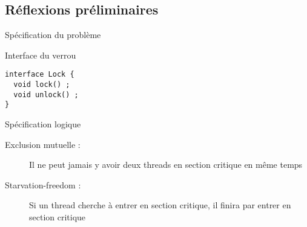 \mode*

\subsection{Réflexions préliminaires}
\begin{frame}[fragile]{Spécification du problème}

\begin{block}{Interface du verrou}
\begin{lstlisting}[numbers=none]
interface Lock {
  void lock() ;
  void unlock() ;
}
\end{lstlisting}
\end{block}

\begin{block}{Spécification logique}
\begin{description}
\item[Exclusion mutuelle : ] Il ne peut jamais y avoir deux threads en section critique en même temps
\item[Starvation-freedom : ] Si un thread cherche à entrer en section critique, il finira par entrer en section critique
\end{description}
\end{block}
\end{frame}


